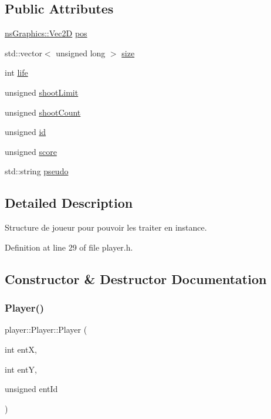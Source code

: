 \subsection*{Public Attributes}
\begin{DoxyCompactItemize}
\item 
\hyperlink{classns_graphics_1_1_vec2_d}{ns\+Graphics\+::\+Vec2D} \hyperlink{structplayer_1_1_player_aec9e16b6c6306f2ce5bfceec6210cb44}{pos}
\item 
std\+::vector$<$ unsigned long $>$ \hyperlink{structplayer_1_1_player_af4901794c6c932a6550973a88a446bac}{size}
\item 
int \hyperlink{structplayer_1_1_player_a5a59435adc56ae2dd435c815f01d1e4d}{life}
\item 
unsigned \hyperlink{structplayer_1_1_player_ae7306efe3b72df4b8ccce8f1612a4729}{shoot\+Limit}
\item 
unsigned \hyperlink{structplayer_1_1_player_a49a0c0e0b5bc07e6fa77cfecac963fb9}{shoot\+Count}
\item 
unsigned \hyperlink{structplayer_1_1_player_a40e8e3d989e0f045aca51d2e41239730}{id}
\item 
unsigned \hyperlink{structplayer_1_1_player_aec52e3bcc8710ab3c4d3d1f128f58e41}{score}
\item 
std\+::string \hyperlink{structplayer_1_1_player_a9294f29c7bcc3e5d44c4b7423cb2f13d}{pseudo}
\end{DoxyCompactItemize}


\subsection{Detailed Description}
Structure de joueur pour pouvoir les traiter en instance. 

Definition at line 29 of file player.\+h.



\subsection{Constructor \& Destructor Documentation}
\mbox{\label{structplayer_1_1_player_aea13d1e63bb4216dd7bb8ed925e9c058}} 
\subsubsection{\texorpdfstring{Player()}{Player()}}
{\footnotesize\ttfamily player\+::\+Player\+::\+Player (\begin{DoxyParamCaption}\item[{int}]{entX,  }\item[{int}]{entY,  }\item[{unsigned}]{ent\+Id }\end{DoxyParamCaption})}



